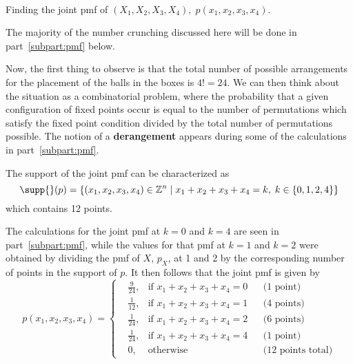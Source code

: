 \documentclass{mthe353answer}
\begin{document}
  \begin{questions}
    \setcounter{question}{2}
    \question{}\
    \begin{subparts}

      \subpart{}
      Finding the joint pmf of \((X_1, X_2, X_3, X_4),\; p(x_1, x_2, x_3, x_4)\).

      \begin{note}
        The majority of the number crunching discussed here will be done in
        part~\ref{subpart:pmf} below.
      \end{note}
      Now, the first thing to observe is that the total number of possible
      arrangements for the placement of the balls in the boxes is \(4! = 24\).
      We can then think about the situation as a combinatorial problem, where
      the probability that a given configuration of fixed points occur is equal
      to the number of permutations which satisfy the fixed point condition
      divided by the total number of permutations possible. The notion of a
      \textbf{derangement} appears during some of the calculations in
      part~\ref{subpart:pmf}.

      The support of the joint pmf can be characterized as
      \begin{equation*}
        \supp{} (p) = \{(x_1, x_2, x_3, x_4) \in \mathbb{Z}^n \mid
          x_1 + x_2 + x_3 + x_4 = k,\; k \in \{0, 1, 2, 4\}\}
      \end{equation*}
      which contains 12 points.

      The calculations for the joint pmf at \(k = 0\) and \(k = 4\) are seen in part~\ref{subpart:pmf},
      while the values for that pmf at \(k = 1\) and \(k = 2\) were obtained by
      dividing the pmf of \(X\), \(p_X\), at 1 and 2 by the corresponding number of points
      in the support of \(p\). It then follows that the joint pmf is given by
      \begin{equation*}
        \boxed{
          p(x_1, x_2, x_3, x_4) = \left\{
          \begin{aligned}
            &\frac{9}{24}, & \text{if } x_1 + x_2 + x_3 + x_4 = 0 && \text{(1 point)}\\
            &\frac{1}{12}, & \text{if } x_1 + x_2 + x_3 + x_4 = 1 && \text{(4 points)}\\
            &\frac{1}{24},  & \text{if } x_1 + x_2 + x_3 + x_4 = 2 && \text{(6 points)}\\
            &\frac{1}{24}, & \text{if } x_1 + x_2 + x_3 + x_4 = 4 && \text{(1 point)}\\
            &0,            & \text{otherwise}                     && \text{(12 points total)}
          \end{aligned}
          \right.
        }
      \end{equation*}


\end{subparts}
\end{questions}
\end{document}
